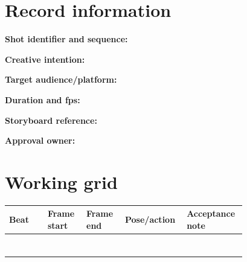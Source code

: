 \documentclass[10pt,letterpaper]{article}
\begin{document}
\makedoctitle
\makedocsummary

\section{Record information}
\noindent\textbf{Shot identifier and sequence:}\quad\hrulefill\par\vspace{10pt}
\noindent\textbf{Creative intention:}\quad\hrulefill\par\vspace{10pt}
\noindent\textbf{Target audience/platform:}\quad\hrulefill\par\vspace{10pt}
\noindent\textbf{Duration and fps:}\quad\hrulefill\par\vspace{10pt}
\noindent\textbf{Storyboard reference:}\quad\hrulefill\par\vspace{10pt}
\noindent\textbf{Approval owner:}\quad\hrulefill\par\vspace{10pt}\section{Working grid}
\begin{longtable}{|p{0.156\linewidth}|p{0.156\linewidth}|p{0.156\linewidth}|p{0.156\linewidth}|p{0.156\linewidth}|}
\hline
\textbf{Beat} & \textbf{Frame start} & \textbf{Frame end} & \textbf{Pose/action} & \textbf{Acceptance note}\\\hline
\endhead
\rule{0pt}{20pt} &  &  &  & \\\hline
\rule{0pt}{20pt} &  &  &  & \\\hline
\rule{0pt}{20pt} &  &  &  & \\\hline
\rule{0pt}{20pt} &  &  &  & \\\hline
\rule{0pt}{20pt} &  &  &  & \\\hline
\rule{0pt}{20pt} &  &  &  & \\\hline
\rule{0pt}{20pt} &  &  &  & \\\hline
\end{longtable}
\end{document}
